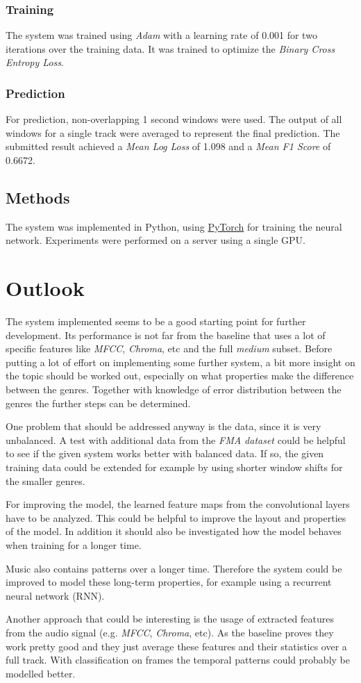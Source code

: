 \documentclass[11pt, twocolumn]{article}
\begin{document}
\subsubsection{Training}
The system was trained using \textit{Adam} with a learning rate of 0.001 for two iterations over the training data. It was trained to optimize the \textit{Binary Cross Entropy Loss}.

\subsubsection{Prediction}
For prediction, non-overlapping 1 second windows were used. The output of all windows for a single track were averaged to represent the final prediction. The submitted result achieved a \textit{Mean Log Loss} of 1.098 and a \textit{Mean F1 Score} of 0.6672.

\subsection{Methods}
The system was implemented in Python, using \href{http://pytorch.org/}{PyTorch} for training the neural network. Experiments were performed on a server using a single GPU. 

\section{Outlook}
The system implemented seems to be a good starting point for further development. Its performance is not far from the baseline that uses a lot of specific features like \textit{MFCC}, \textit{Chroma}, etc and the full \textit{medium} subset. Before putting a lot of effort on implementing some further system, a bit more insight on the topic should be worked out, especially on what properties make the difference between the genres. Together with knowledge of error distribution between the genres the further steps can be determined. 

One problem that should be addressed anyway is the data, since it is very unbalanced. A test with additional data from the \textit{FMA dataset} could be helpful to see if the given system works better with balanced data. If so, the given training data could be extended for example by using shorter window shifts for the smaller genres.

For improving the model, the learned feature maps from the convolutional layers have to be analyzed. This could be helpful to improve the layout and properties of the model. In addition it should also be investigated how the model behaves when training for a longer time.

Music also contains patterns over a longer time. Therefore the system could be improved to model these long-term properties, for example using a recurrent neural network (RNN). 

Another approach that could be interesting is the usage of extracted features from the audio signal (e.g. \textit{MFCC}, \textit{Chroma}, etc). As the baseline proves they work pretty good and they just average these features and their statistics over a full track. With classification on frames the temporal patterns could probably be modelled better.



\end{document}

